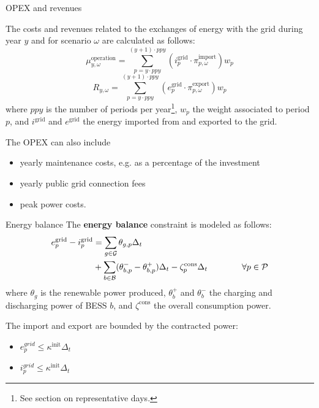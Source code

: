 \begin{frame}[allowframebreaks]{OPEX and revenues}

The costs and revenues related to the exchanges of energy with the grid during year $y$ and for scenario $\omega$ are calculated as follows:
$$\mu^{\text{operation}}_{y, \omega} = \sum_{p=y\cdot ppy}^{(y+1)\cdot ppy} (i^\text{grid}_{p} \cdot \pi_{p, \omega}^{\text{import}}) w_p$$
$$R_{y,\omega} =  \sum_{p=y\cdot ppy}^{(y+1)\cdot ppy} ({e}^\text{grid}_{p} \cdot \pi_{p,\omega}^{\text{export}}) w_p$$
where $ppy$ is the number of periods per year\footnote{See section on representative days.}, $w_p$ the weight associated to period $p$, and $\ensuremath{i}^\text{grid}$ and $\ensuremath{e}^\text{grid}$ the energy imported from and exported to the grid. 

The OPEX can also include 
\begin{itemize}
    \item yearly maintenance costs, e.g. as a percentage of the investment %
    \item yearly public grid connection fees %
    \item peak power costs. %
\end{itemize}
\end{frame}



\begin{frame}{Energy balance}
The \textbf{energy balance} constraint is modeled as follows:
\begin{align}
    \ensuremath{e}^\text{grid}_{p} - \ensuremath{i}^\text{grid}_{p}  &= \sum_{g \in \mathcal{G}}  \theta_{g,p} \Delta_t 
     \\ \notag
    &+ \sum_{b \in \mathcal{B}} (\theta_{b,p}^- - \theta_{b,p}^+) \Delta_t  - \zeta^\text{cons}_p  \Delta_t  \text{~~~~~~~~~~~~} \forall p \in \mathcal{P}
\end{align}
where $\theta_g$ is the renewable power produced, $\theta_b^+$ and $\theta_b^-$ the charging and discharging power of BESS $b$, and $\zeta^\text{cons}$ the overall consumption power.

The import and export are bounded by the contracted power:
\begin{itemize}
    \item  $e^{grid}_p \leq \kappa^{\text{init}} \Delta_t$
    \item  $i^{grid}_p \leq \kappa^{\text{init}} \Delta_t$
\end{itemize}
\end{frame}



